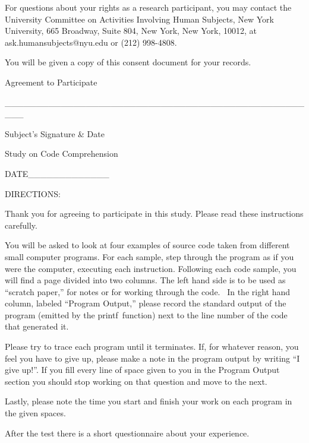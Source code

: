 \documentclass[12pt, a4paper, oneside]{article}
\begin{document}
For questions about your rights as a research participant, you may
contact the University Committee on Activities Involving Human Subjects,
New York University, 665 Broadway, Suite 804, New York, New York, 10012,
at ask.humansubjects@nyu.edu or (212) 998-4808.

You will be given a copy of this consent document for your records.

\vspace{20pt}

Agreement to Participate

\vspace{20pt}

{\_\_\_\_\_\_\_\_\_\_\_\_\_\_\_\_\_\_\_\_\_\_\_\_\_\_\_\_\_\_\_\_\_\_\_\_\_\_\_\_\_\_\_\_\_\_\_\_\_\_\_}

Subject's Signature \& Date

\pagebreak

Study on Code Comprehension

DATE\_\_\_\_\_\_\_\_\_\_\_\_\_~~~~~~~~~~~~~~~~~~~~~~~~~~~~~~~~~~~~~~~~


{DIRECTIONS:}

{Thank you for agreeing to participate in this study. Please read these
instructions carefully.}

{You will be asked to look at four examples of source code taken from
different small computer programs. For each sample, }{step through the
program as if you were the computer, executing each instruction.
Following each code sample, you will find a page divided into two
columns. The left hand side is to be used as ``scratch paper,'' for
notes or for working through the code. ~In the right hand column,
labeled ``Program Output,'' please record the standard output of the
program (emitted by the }{printf}{~function) next to the line number of
the code that generated it.}

Please try to trace each program until it terminates. If, for whatever reason, you feel you have to give up, please make a note in the program output by writing “I give up!”. If you fill every line of space given to you in the Program Output section you should stop working on that question and move to the next.

Lastly, please note the time you start and finish your work on each program in the given spaces.

After the test there is a short questionnaire about your experience.
\end{document}
